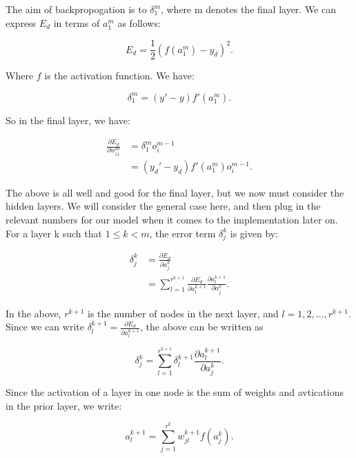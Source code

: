 The aim of backpropogation is to $\delta^m_1$, where m denotes the final layer. We can express $E_d$ in terms of $a_1^m$ as follows:

\begin{equation}
    E_d = \frac{1}{2} (f(a_1^m)-y_d)^2.
\end{equation}

Where $f$ is the activation function. We have:

\begin{equation}
    \delta_1^m = (y'-y)f'(a_1^m).
\end{equation}

So in the final layer, we have:

\begin{align}
    \frac{\partial E_d}{\partial w_{i1}^m} &= \delta_1^mo_i^{m-1} \\
                                           &= (y_d'-y_d)f'(a_1^m)o_i^{m-1}.
\end{align}

The above is all well and good for the final layer, but we now must consider the hidden layers. We will consider the general case here, and then plug in the relevant
numbers for our model when it comes to the implementation later on. For a layer k such that $1 \leq k < m$, the error term $\delta^k_j$ is given by:

\begin{align}
    \delta_j^k &= \frac{\partial E_d}{\partial a_j^k} \\
               &= \sum_{l=1}^{r^{k+1}} \frac{\partial E_d}{\partial a_l^{k+1}}\frac{\partial a_l^{k+1}}{\partial a_j^k}.
\end{align}

In the above, $r^{k+1}$ is the number of nodes in the next layer, and $ l = 1,2,\ldots,r^{k+1}$. Since we can write $\delta_l^{k+1} = \frac{\partial E_d}{\partial a_l^{k+1}}$, the above can be written
as 

\begin{equation}
    \label{deltajk}
    \delta_j^k = \sum_{l=1}^{r^{k+1}}\delta_l^{k+1}\frac{\partial a_l^{k+1}}{\partial a_j^k}.
\end{equation}

Since the activation of a layer in one node is the sum of weights and avtications in the prior layer, we write:

\begin{equation}
    a_l^{k+1} = \sum^{r^k}_{j=1} w_{jl}^{k+1}f(a_j^k).
\end{equation}

